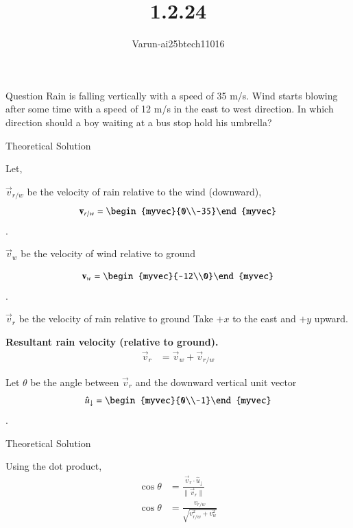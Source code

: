 \documentclass{beamer}
\title %
{1.2.24}
\author %
{Varun-ai25btech11016}
\begin{document}
\frame{\titlepage}
\begin{frame}{Question}
Rain is falling vertically with a speed of 35 m/s. Wind starts blowing after some time with a speed of 12 m/s in the east to west direction. In which direction should a boy waiting at a bus stop hold his umbrella?\\

\end{frame}



\begin{frame}{Theoretical Solution }

 Let,


$\vec{v}_{r/w}$ be the velocity of rain relative to the wind (downward), 
$$\vec{v}_{r/w}=\begin{myvec}{0\\-35}\end{myvec}$$.

$\vec{v}_{w}$ be the velocity of wind relative to ground 

$$\vec{v}_{w}=\begin{myvec}{-12\\0}\end{myvec}$$.

$\vec{v}_{r}$ be the velocity of rain relative to ground 
Take $+x$ to the east and $+y$ upward.


\textbf{Resultant rain velocity (relative to ground).}
\begin{align}
    \vec{v}_{r} &= \vec{v}_{w} + \vec{v}_{r/w}
\end{align}


Let $\theta$ be the angle between $\vec{v}_{r}$ and the downward vertical unit vector $$\hat{u}_{\downarrow}=\begin{myvec}{0\\-1}\end{myvec}$$.

\end{frame}
\begin{frame}{Theoretical Solution}


Using the dot product,
\begin{align}
    \cos\theta &= \frac{\vec{v}_{r}\cdot \hat{u}_{\downarrow}}{\|\vec{v}_{r}\|} \\
    \cos\theta &= \frac{v_{r/w}}{\sqrt{v_{r/w}^2 + v_w^2}}
\end{align}

\end{frame}
\end{document}

